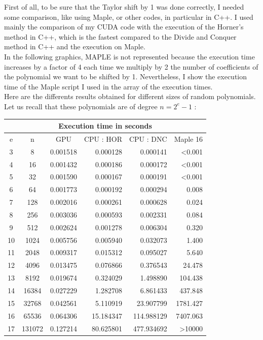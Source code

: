First of all, to be sure that the Taylor shift by 1 was done correctly, I needed some comparison, like using Maple, or other codes, in particular in C++. I used mainly the comparison of my CUDA code with the execution of the Horner's method in C++, which is the fastest compared to the Divide and Conquer method in C++ and the execution on Maple. \\

In the following graphics, MAPLE is not represented because the execution time increases by a factor of 4 each time we multiply by 2 the number of coefficients of the polynomial we want to be shifted by 1. Nevertheless, I show the execution time of the Maple script I used in the array of the execution times. \\

Here are the differents results obtained for different sizes of random polynomials. Let us recall that these polynomials are of degree $n = 2^e-1$ : \\

\begin{center}
\begin{tabular}{||c|c||c||r|r||r||}
   \hline
  \multicolumn{6}{||c||}{Execution time in seconds} \\
 \hline
  e  &    n    &    GPU     &  CPU : HOR  &   CPU : DNC  &  Maple 16   \\  \hline \hline
  3  &      8  &  0.001518  &   0.000128  &    0.000141  &     <0.001  \\
  4  &     16  &  0.001432  &   0.000186  &    0.000172  &     <0.001  \\
  5  &     32  &  0.001590  &   0.000167  &    0.000191  &     <0.001  \\
  6  &     64  &  0.001773  &   0.000192  &    0.000294  &      0.008  \\
  7  &    128  &  0.002016  &   0.000261  &    0.000628  &      0.024  \\
  8  &    256  &  0.003036  &   0.000593  &    0.002331  &      0.084  \\
  9  &    512  &  0.002624  &   0.001278  &    0.006304  &      0.320  \\
 10  &   1024  &  0.005756  &   0.005940  &    0.032073  &      1.400  \\
 11  &   2048  &  0.009317  &   0.015312  &    0.095027  &      5.640  \\
 12  &   4096  &  0.013475  &   0.076866  &    0.376543  &     24.478  \\
 13  &   8192  &  0.019674  &   0.324029  &    1.498890  &    104.438  \\
 14  &  16384  &  0.027229  &   1.282708  &    6.861433  &    437.848  \\
 15  &  32768  &  0.042561  &   5.110919  &   23.907799  &   1781.427  \\
 16  &  65536  &  0.064306  &  15.184347  &  114.988129  &   7407.063  \\
 17  & 131072  &  0.127214  &  80.625801  &  477.934692  &     >10000  \\
   \hline 
\end{tabular}
\end{center}

